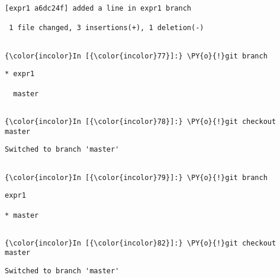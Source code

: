     \begin{Verbatim}[commandchars=\\\{\}]
[expr1 a6dc24f] added a line in expr1 branch

 1 file changed, 3 insertions(+), 1 deletion(-)


    \end{Verbatim}

    \begin{Verbatim}[commandchars=\\\{\}]
{\color{incolor}In [{\color{incolor}77}]:} \PY{o}{!}git branch
\end{Verbatim}

    \begin{Verbatim}[commandchars=\\\{\}]
* expr1

  master


    \end{Verbatim}

    \begin{Verbatim}[commandchars=\\\{\}]
{\color{incolor}In [{\color{incolor}78}]:} \PY{o}{!}git checkout master
\end{Verbatim}

    \begin{Verbatim}[commandchars=\\\{\}]
Switched to branch 'master'


    \end{Verbatim}

    \begin{Verbatim}[commandchars=\\\{\}]
{\color{incolor}In [{\color{incolor}79}]:} \PY{o}{!}git branch
\end{Verbatim}

    \begin{Verbatim}[commandchars=\\\{\}]
  expr1

* master


    \end{Verbatim}



    \begin{Verbatim}[commandchars=\\\{\}]
{\color{incolor}In [{\color{incolor}82}]:} \PY{o}{!}git checkout master
\end{Verbatim}

    \begin{Verbatim}[commandchars=\\\{\}]
Switched to branch 'master'


    \end{Verbatim}


